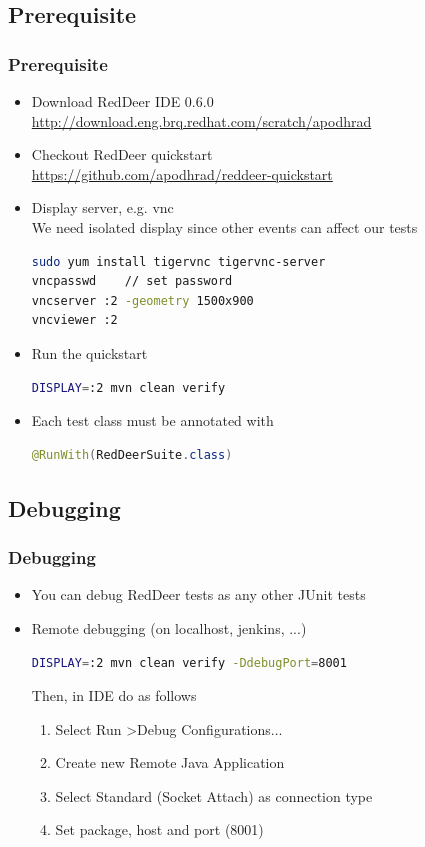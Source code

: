 \documentclass{beamer}
\begin{document}
\subsection{Prerequisite}
\begin{frame}[fragile]
\frametitle{Prerequisite}
\begin{itemize}
\item Download RedDeer IDE 0.6.0\\\url{http://download.eng.brq.redhat.com/scratch/apodhrad}
\item Checkout RedDeer quickstart\\\url{https://github.com/apodhrad/reddeer-quickstart}
\item Display server, e.g. vnc\\We need isolated display since other events can affect our tests
\begin{lstlisting}[language=sh]
sudo yum install tigervnc tigervnc-server
vncpasswd    // set password
vncserver :2 -geometry 1500x900
vncviewer :2
\end{lstlisting}
\item Run the quickstart
\begin{lstlisting}[language=sh]
DISPLAY=:2 mvn clean verify
\end{lstlisting}
\item Each test class must be annotated with
\begin{lstlisting}[language=Java]
@RunWith(RedDeerSuite.class)
\end{lstlisting}
\end{itemize}
\end{frame}

\subsection{Debugging}
\begin{frame}[fragile]
\frametitle{Debugging}
\begin{itemize}
\item You can debug RedDeer tests as any other JUnit tests
\item Remote debugging (on localhost, jenkins, ...)
\begin{lstlisting}[language=sh]
DISPLAY=:2 mvn clean verify -DdebugPort=8001
\end{lstlisting}
Then, in IDE do as follows
\begin{enumerate}
\item Select Run \textgreater Debug Configurations...
\item Create new Remote Java Application
\item Select Standard (Socket Attach) as connection type
\item Set package, host and port (8001)
\end{enumerate}
\end{itemize}
\end{frame}
\end{document}
